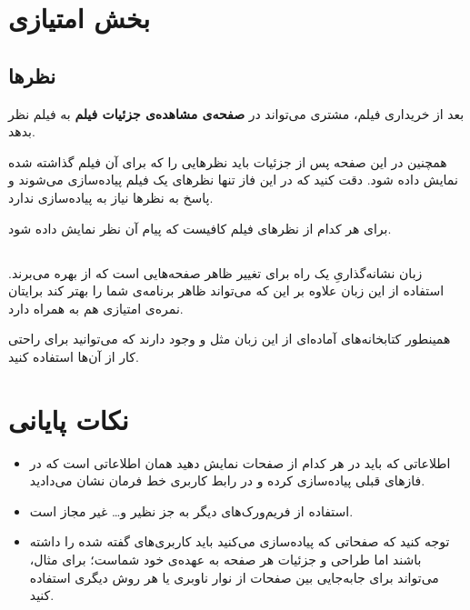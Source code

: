 \documentclass{utap}
\begin{document}
    
    
    
    
    
    \section{بخش امتیازی}
    	\subsection{نظر‌ها}
    	بعد از خریداری فیلم، مشتری می‌تواند در  
    	\textbf{صفحه‌ی مشاهده‌ی جزئیات فیلم}
    	به فیلم نظر بدهد. 
    	
    	همچنین در این صفحه پس از جزئیات باید نظرهایی را که برای آن فیلم گذاشته شده نمایش داده شود. دقت کنید که در این فاز تنها نظر‌های یک فیلم پیاده‌سازی می‌شوند و پاسخ به نظر‌ها نیاز به پیاده‌سازی ندارد.
    	
    	     برای هر کدام از نظر‌های فیلم کافیست که پیام آن نظر‌ نمایش داده شود.
    	
        \subsection{}
    زبان نشانه‌گذاریِ 
 یک راه برای تغییر ظاهر صفحه‌هایی است که از  بهره می‌برند. استفاده از این زبان علاوه بر این که می‌تواند ظاهر برنامه‌ی شما را بهتر کند برایتان نمره‌ی امتیازی هم به همراه دارد.
 
 همینطور کتابخانه‌های آماده‌ای از این زبان مثل
  و
  وجود دارند که می‌توانید برای راحتی کار از آن‌ها استفاده کنید. 
 
 
 
 
    \section{نکات پایانی}
        \begin{itemize}
            \item  اطلاعاتی که باید در هر کدام از صفحات نمایش دهید همان اطلاعاتی است که در فاز‌های قبلی پیاده‌سازی کرده‌ و در رابط کاربری خط فرمان نشان می‌دادید. 
            \item  
            استفاده از فریم‌ورک‌های دیگر به جز
                نظیر 
                و\dots{} غیر مجاز است.
                
            \item 
            توجه کنید که صفحاتی که پیادەسازی می‌کنید باید کاربری‌های گفته شده را داشته باشند اما طراحی و جزئیات هر صفحه به عهدەی خود شماست؛ برای مثال، می‌تواند برای جابه‌جایی بین صفحات از نوار ناوبری
            یا هر روش دیگری استفاده کنید. 
    	\end{itemize}
\end{document}
